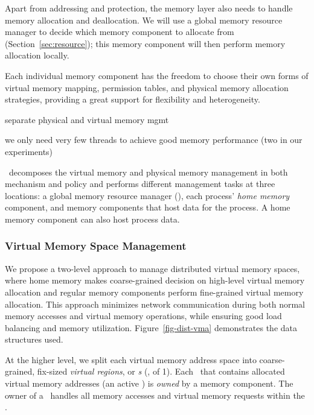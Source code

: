 \documentclass[10pt,times,twocolumn]{z2-article}
\begin{document}
{{{{{{{%


Apart from addressing and protection, the memory layer also needs to handle memory allocation and deallocation. 
We will use a global memory resource manager to decide which memory component to allocate from (Section~\ref{sec:resource}); 
this memory component will then perform memory allocation locally.

Each individual memory component has the freedom to choose their own forms of virtual memory mapping, permission tables, and 
physical memory allocation strategies, providing a great support for flexibility and heterogeneity.

separate physical and virtual memory mgmt

we only need very few threads to achieve good memory performance (two in our experiments)
\fi

\lego\ decomposes the virtual memory and physical memory management
in both mechanism and policy
and performs different management tasks at three locations:
a global memory resource manager ({\em \gmm}),
each process' {\em home memory} component,
and memory components that host data for the process.
A home memory component can also host process data.

\subsubsection{Virtual Memory Space Management}
We propose a two-level approach to manage distributed virtual memory spaces,
where home memory makes coarse-grained decision on high-level virtual memory allocation
and regular memory components perform fine-grained virtual memory allocation.
This approach minimizes network communication during both normal memory accesses and virtual memory operations,
while ensuring good load balancing and memory utilization.
Figure~\ref{fig-dist-vma} demonstrates the data structures used. %

At the higher level, we split each virtual memory address space into coarse-grained, fix-sized {\em virtual regions},
or {\em \vregion{}s} (\eg, of 1\GB).
Each \vregion\ that contains allocated virtual memory addresses (an active \vregion) is {\em owned} by a memory component.
The owner of a \vregion\ handles all memory accesses and virtual memory requests within the \vregion.

}}}}}}}
\end{document}
